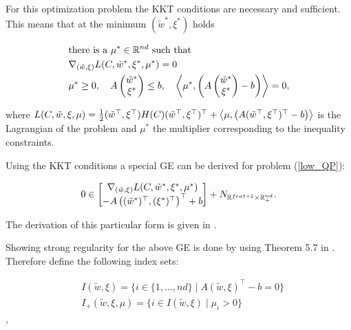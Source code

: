 For this optimization problem the KKT conditions are necessary and sufficient. This means that at the minimum \((\tilde{w}^*,\xi^*)\) holds

\begin{align*}
	& \text{there is a } \mu^* \in \mathbb{R}^{nd} \text{ such that} \\
	&\nabla_{(\tilde{w},\xi)} L(C,\tilde{w}^*,\xi^*,\mu^*) = 0 \\
	& \mu^* \geq 0, \quad A \begin{pmatrix}\tilde{w}^*\\\xi^*\end{pmatrix} \leq b, \quad \left\langle\mu^*,\left(A \begin{pmatrix}\tilde{w}^*\\\xi^*\end{pmatrix} - b\right)\right\rangle = 0,
\end{align*}

where \(L(C,\tilde{w},\xi,\mu) = \frac{1}{2}(\tilde{w}^{\top},\xi^{\top})H(C)(\tilde{w}^{\top},\xi^{\top})^{\top}+\left\langle\mu,\left(A (\tilde{w}^{\top},\xi^{\top})^{\top} - b\right)\right\rangle\) is the Lagrangian of the problem and \(\mu^*\) the multiplier corresponding to the inequality constraints.

Using the KKT conditions a special GE can be derived for problem (\ref{low_QP}):

\begin{equation}
	0 \in \begin{bmatrix} \nabla_{(\tilde{w},\xi)}L(C,\tilde{w}^*,\xi^*,\mu^*)\\ - A \left((\tilde{w}^*)^{\top},(\xi^*)^{\top}\right)^{\top} + b\end{bmatrix} + N_{\mathbb{R}^{feat+1}\times\mathbb{R}^{nd}_+}.
\label{GE}
\end{equation}

The derivation of this particular form is given in \cite[chapter 4, p. 71--72 and chapter 5, p. 92]{Outrata1998}.

Showing strong regularity for the above GE is done by using Theorem 5.7 in \cite{Outrata1998}.
Therefore define the following index sets:

\begin{align*}
	& I(\tilde{w},\xi) = \{i \in \{1,...,nd\} \mid A (\tilde{w},\xi)^{\top} - b = 0\} \\
	& I_+(\tilde{w},\xi,\mu) = \{i\in I(\tilde{w},\xi) \mid \mu_i > 0\}
\end{align*},


